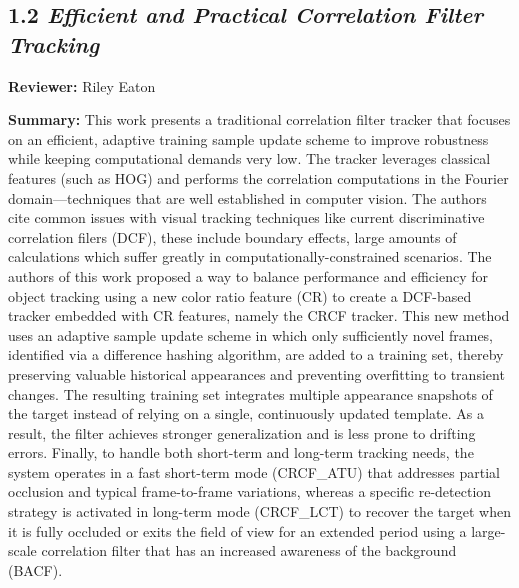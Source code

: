 \documentclass{article}
\begin{document}
\vspace{0.3cm}

\subsection*{1.2 \textit{Efficient and Practical Correlation Filter Tracking}}

\hspace*{\parindent}\textbf{Reviewer:} Riley Eaton

\vspace{0.3cm}

\textbf{Summary:} This work presents a traditional correlation filter tracker that focuses on an efficient, adaptive training sample update scheme to improve robustness while keeping computational demands very low. The tracker leverages classical features (such as HOG) and performs the correlation computations in the Fourier domain—techniques that are well established in computer vision. The authors cite common issues with visual tracking techniques like current discriminative correlation filers (DCF), these include boundary effects, large amounts of calculations which suffer greatly in computationally-constrained scenarios. The authors of this work proposed a way to balance performance and efficiency for object tracking using a new color ratio feature (CR) to create a DCF-based tracker embedded with CR features, namely the CRCF tracker. This new method uses an adaptive sample update scheme in which only sufficiently novel frames, identified via a difference hashing algorithm, are added to a training set, thereby preserving valuable historical appearances and preventing overfitting to transient changes. The resulting training set integrates multiple appearance snapshots of the target instead of relying on a single, continuously updated template. As a result, the filter achieves stronger generalization and is less prone to drifting errors. Finally, to handle both short-term and long-term tracking needs, the system operates in a fast short-term mode (CRCF\_ATU) that addresses partial occlusion and typical frame-to-frame variations, whereas a specific re-detection strategy is activated in long-term mode (CRCF\_LCT) to recover the target when it is fully occluded or exits the field of view for an extended period using a large-scale correlation filter that has an increased awareness of the background (BACF).

\vspace{0.3cm}
\end{document}
